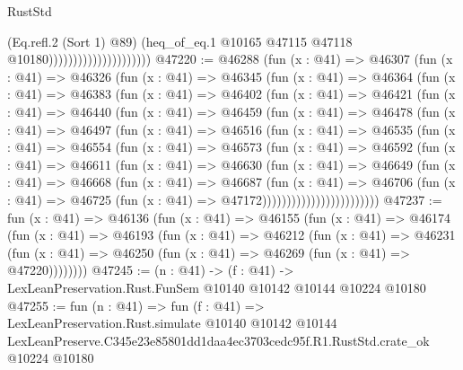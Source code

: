 \begin{lexlean}{RustStd}
\begin{coremodule}
                                            (Eq.refl.{2} (Sort 1) @89)
                                            (heq_of_eq.{1}
                                              @10165
                                              @47115
                                              @47118
                                              @10180)))))))))))))))))))))
@47220 := @46288
    (fun (x : @41) =>
    @46307
      (fun (x : @41) =>
      @46326
        (fun (x : @41) =>
        @46345
          (fun (x : @41) =>
          @46364
            (fun (x : @41) =>
            @46383
              (fun (x : @41) =>
              @46402
                (fun (x : @41) =>
                @46421
                  (fun (x : @41) =>
                  @46440
                    (fun (x : @41) =>
                    @46459
                      (fun (x : @41) =>
                      @46478
                        (fun (x : @41) =>
                        @46497
                          (fun (x : @41) =>
                          @46516
                            (fun (x : @41) =>
                            @46535
                              (fun (x : @41) =>
                              @46554
                                (fun (x : @41) =>
                                @46573
                                  (fun (x : @41) =>
                                  @46592
                                    (fun (x : @41) =>
                                    @46611
                                      (fun (x : @41) =>
                                      @46630
                                        (fun (x : @41) =>
                                        @46649
                                          (fun (x : @41) =>
                                          @46668
                                            (fun (x : @41) =>
                                            @46687
                                              (fun (x : @41) =>
                                              @46706
                                                (fun (x : @41) =>
                                                @46725
                                                  (fun (x : @41) => @47172))))))))))))))))))))))))
@47237 := fun (x : @41) =>
  @46136
    (fun (x : @41) =>
    @46155
      (fun (x : @41) =>
      @46174
        (fun (x : @41) =>
        @46193
          (fun (x : @41) =>
          @46212
            (fun (x : @41) =>
            @46231
              (fun (x : @41) => @46250 (fun (x : @41) => @46269 (fun (x : @41) => @47220))))))))
@47245 := (n : @41) ->
  (f : @41) -> LexLeanPreservation.Rust.FunSem @10140 @10142 @10144 @10224 @10180
@47255 := fun (n : @41) =>
  fun (f : @41) =>
  LexLeanPreservation.Rust.simulate
    @10140
    @10142
    @10144
    LexLeanPreserve.C345e23e85801dd1daa4ec3703cedc95f.R1.RustStd.crate_ok
    @10224
    @10180
\end{coremodule}
\end{lexlean}
